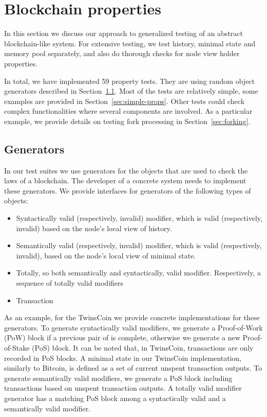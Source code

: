 
\section{Blockchain properties}
\label{sec:props}

In this section we discuss our approach to generalized testing of an abstract blockchain-like system. For extensive testing, we test history, minimal state and memory pool separately, and also do thorough checks for node view holder properties.
	
In total, we have implemented 59 property tests. They are using random object generators described in Section~\ref{sec:generators}. Most of the tests are relatively simple, some examples are provided in Section~\ref{sec:simple-props}. Other tests could check complex functionalities where several components are involved. As a particular example, we provide details on testing fork processing in Section~\ref{sec:forking}.

\subsection{Generators}
\label{sec:generators}

In our test suites we use generators for the objects that are used to check the laws of a blockchain. The developer of a concrete system needs to implement these generators. We provide interfaces for generators of the following types of objects:

\begin{itemize}
	\item{Syntactically valid (respectively, invalid) modifier, which is valid (respectively, invalid) based on the node's local view of history.}
	\item{Semantically valid (respectively, invalid) modifier, which is valid (respectively, invalid), based on the node's local view of minimal state.}
	\item{Totally, so both semantically and syntactically, valid modifier. Respectively, a sequence of totally valid modifiers}
	\item{Transaction}
\end{itemize}

As an example, for the TwinsCoin we provide concrete implementations for these generators. To generate syntactically valid modifiers, we generate a Proof-of-Work (PoW) block if a previous pair of {\em<PoW block, PoS block>} is complete, otherwise we generate a new Proof-of-Stake (PoS) block. It can be noted that, in TwinsCoin, transactions are only recorded in PoS blocks. A minimal state in our TwinsCoin implementation, similarly to Bitcoin, is defined as a set of current unspent transaction outputs. To generate semantically valid modifiers, we generate a PoS block including transactions based on unspent transaction outputs. A totally valid modifier generator has a matching PoS block among a syntactically valid and a semantically valid modifier. %

